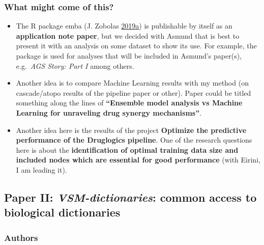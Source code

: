 \documentclass[
  12pt,
]{book}
\begin{document}
\hypertarget{what-might-come-of-this}{%
\subsubsection*{What might come of this?}\label{what-might-come-of-this}}

\begin{itemize}
\item
  The R package emba (J. Zobolas \protect\hyperlink{ref-R-emba}{2019}\protect\hyperlink{ref-R-emba}{a}) is publishable by itself as an \textbf{application note paper}, but we decided with Asmund that is best to present it with an analysis on some dataset to show its use.
  For example, the package is used for analyses that will be included in Asmund's paper(s), e.g.~\emph{AGS Story: Part I} among others.
\item
  Another idea is to compare Machine Learning results with my method (on cascade/atopo results of the pipeline paper or other).
  Paper could be titled something along the lines of \textbf{``Ensemble model analysis vs Machine Learning for unraveling drug synergy mechanisms''}.
\item
  Another idea here is the results of the project \textbf{Optimize the predictive performance of the Druglogics pipeline}.
  One of the research questions here is about the \textbf{identification of optimal training data size and included nodes which are essential for good performance} (with Eirini, I am leading it).
\end{itemize}

\hypertarget{paper-ii-vsm-dictionaries-common-access-to-biological-dictionaries}{%
\subsection*{\texorpdfstring{Paper II: \emph{VSM-dictionaries}: common access to biological dictionaries}{Paper II: VSM-dictionaries: common access to biological dictionaries}}\label{paper-ii-vsm-dictionaries-common-access-to-biological-dictionaries}}

\hypertarget{authors-1}{%
\subsubsection*{Authors}\label{authors-1}}
\end{document}
